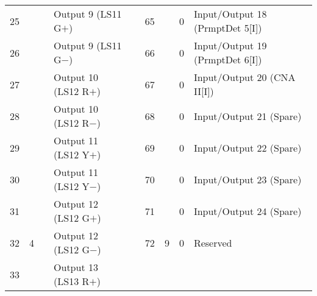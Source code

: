 \documentclass[]{article}
\begin{document}
\begin{landscape}
\begin{table}[ht]
\begin{tabular}{lllllllll}
			25           &                     &                    & Output 9 (LS11 G$+$)           &                    & 65                       &                                            & 0                                          & Input/Output 18 (PrmptDet 5{[}I{]})       \\
			26           &                     &                    & Output 9 (LS11 G$-$)           &                    & 66                       &                                            & 0                                          & Input/Output 19 (PrmptDet 6{[}I{]})       \\
			27           &                     &                    & Output 10 (LS12 R$+$)          &                    & 67                       &                                            & 0                                          & Input/Output 20 (CNA II{[}I{]})           \\
			28           &                     &                    & Output 10 (LS12 R$-$)          &                    & 68                       &                                            & 0                                          & Input/Output 21 (Spare)                   \\
			29           &                     &                    & Output 11 (LS12 Y$+$)          &                    & 69                       &                                            & 0                                          & Input/Output 22 (Spare)                   \\
			30           &                     &                    & Output 11 (LS12 Y$-$)          &                    & 70                       &                                            & 0                                          & Input/Output 23 (Spare)                   \\
			31           &                     &                    & Output 12 (LS12 G$+$)          &                    & 71                       &                                            & 0                                          & Input/Output 24 (Spare)                   \\
			32           & \multirow{-8}{*}{4} & \multirow{-8}{*}{} & Output 12 (LS12 G$-$)          &                    & 72                       & \multirow{-8}{*}{9}                        & 0                                          & Reserved                                  \\ \cline{1-4} \cline{6-9} 
			33           &                     &                    & Output 13 (LS13 R$+$)          &                    & \cellcolor[HTML]{C0C0C0} & \cellcolor[HTML]{C0C0C0}                   & \cellcolor[HTML]{C0C0C0}                   & \cellcolor[HTML]{C0C0C0}                  \\

\end{tabular}
\end{table}
\end{landscape}
\end{document}

